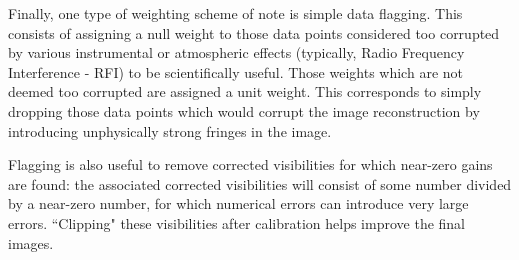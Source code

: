 \pg
Finally, one type of weighting scheme of note is simple data flagging. This consists of assigning a null weight to those data points considered too corrupted by various instrumental or atmospheric effects (typically, Radio Frequency Interference - RFI) to be scientifically useful. Those weights which are not deemed too corrupted are assigned a unit weight. This corresponds to simply dropping those data points which would corrupt the image reconstruction by introducing unphysically strong fringes in the image.

\pg
Flagging is also useful to remove corrected visibilities for which near-zero gains are found: the associated corrected visibilities will consist of some number divided by a near-zero number, for which numerical errors can introduce very large errors. ``Clipping" these visibilities after calibration helps improve the final images.